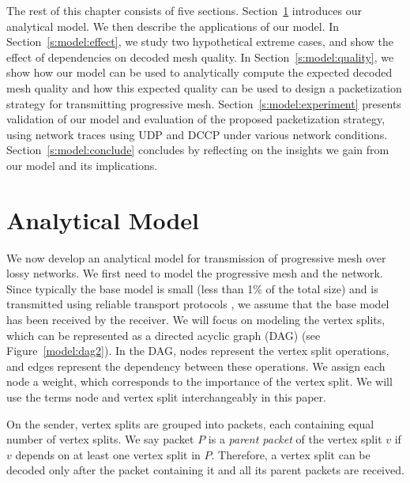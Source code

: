 
    The rest of this chapter consists of five sections. 
    Section~\ref{s:model:model} introduces our analytical model.
    We then describe the applications of our model.
    In Section~\ref{s:model:effect}, we study two hypothetical extreme
    cases, and show the effect of dependencies on
    decoded mesh quality.
    In Section~\ref{s:model:quality}, we show how our
    model can be used to analytically compute the expected
    decoded mesh quality and how this expected quality
    can be used to design a packetization strategy for transmitting
    progressive mesh.  Section~\ref{s:model:experiment} presents validation
    of our model and evaluation of the proposed packetization strategy,
    using network traces using UDP and DCCP under various
    network conditions.  
    Section~\ref{s:model:conclude} concludes by
    reflecting on the insights we gain from our model and its
    implications.

\section{Analytical Model}
\label{s:model:model}
    We now develop an analytical model for transmission of
    progressive mesh over lossy networks.  We first need to model
    the progressive mesh and the network.  Since typically
    the base model is small (less than 1\% of the total size) 
    and is transmitted using reliable
    transport protocols \cite{3tpregib}, we assume that the
    base model has been received by the
    receiver. We will focus on modeling the vertex splits,
    which can be represented as a directed acyclic graph (DAG)
    (see Figure~\ref{model:dag2}). In the DAG, nodes represent
    the vertex split operations, and edges represent the dependency
    between these operations. We assign each node a weight,
    which corresponds to the importance of the vertex split.
    We will use the terms node and vertex split interchangeably
    in this paper.

    On the sender, vertex splits are grouped into packets,
    each containing equal number of vertex splits.  We say packet $P$ is a \textit{parent packet}
    of the vertex split $v$ if %
    $v$ 
    depends on at least one vertex split in $P$.  Therefore, a vertex split
    can be decoded only after the packet containing it and all its
    parent packets are received.

